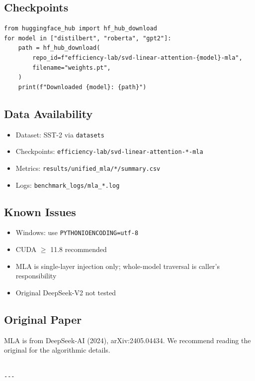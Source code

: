 \subsection{Checkpoints}

\begin{lstlisting}
from huggingface_hub import hf_hub_download
for model in ["distilbert", "roberta", "gpt2"]:
    path = hf_hub_download(
        repo_id=f"efficiency-lab/svd-linear-attention-{model}-mla",
        filename="weights.pt",
    )
    print(f"Downloaded {model}: {path}")
\end{lstlisting}

\subsection{Data Availability}

\begin{itemize}
\item Dataset: SST-2 via \texttt{datasets}
\item Checkpoints: \texttt{efficiency-lab/svd-linear-attention-*-mla}
\item Metrics: \texttt{results/unified\_mla/*/summary.csv}
\item Logs: \texttt{benchmark\_logs/mla\_*.log}

\end{itemize}
\subsection{Known Issues}

\begin{itemize}
\item Windows: use \texttt{PYTHONIOENCODING=utf-8}
\item CUDA $\ge$ 11.8 recommended
\item MLA is single-layer injection only; whole-model traversal is caller's
  responsibility
\item Original DeepSeek-V2 not tested

\end{itemize}
\subsection{Original Paper}

MLA is from DeepSeek-AI (2024), arXiv:2405.04434. We recommend reading 
the original for the algorithmic details.
\begin{lstlisting}

---
\end{lstlisting}


